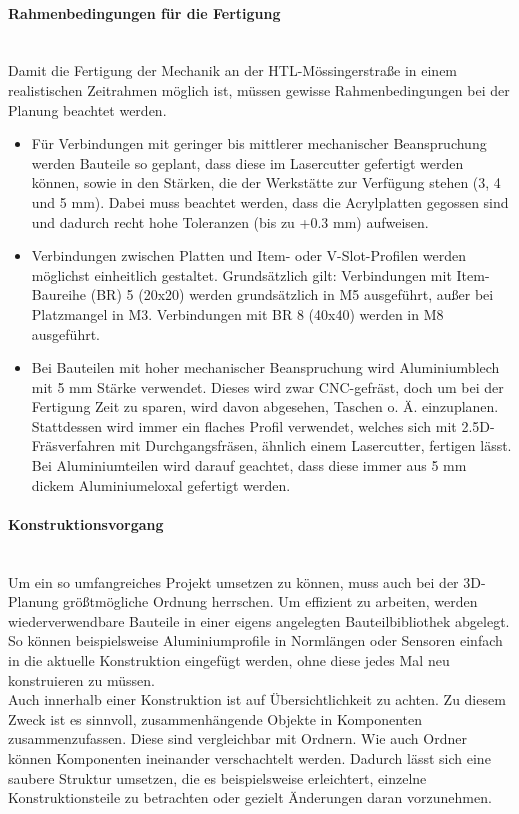 \paragraph{Rahmenbedingungen für die Fertigung}\mbox{}\\
Damit die Fertigung der Mechanik an der HTL-Mössingerstraße in einem realistischen Zeitrahmen möglich ist, müssen gewisse Rahmenbedingungen bei der Planung beachtet werden.
\begin{itemize}
    \item Für Verbindungen mit geringer bis mittlerer mechanischer Beanspruchung werden Bauteile so geplant, dass diese im Lasercutter gefertigt werden können, sowie in den Stärken, die der Werkstätte zur Verfügung stehen (3, 4 und 5 mm). Dabei muss beachtet werden, dass die Acrylplatten gegossen sind und dadurch recht hohe Toleranzen (bis zu +0.3 mm) aufweisen.
    \item Verbindungen zwischen Platten und Item- oder V-Slot-Profilen werden möglichst einheitlich gestaltet. Grundsätzlich gilt: Verbindungen mit Item-Baureihe (BR) 5 (20x20) werden grundsätzlich in M5 ausgeführt, außer bei Platzmangel in M3. Verbindungen mit BR 8 (40x40) werden in M8 ausgeführt.
    \item Bei Bauteilen mit hoher mechanischer Beanspruchung wird Aluminiumblech mit 5 mm Stärke verwendet. Dieses wird zwar CNC-gefräst, doch um bei der Fertigung Zeit zu sparen, wird davon abgesehen, Taschen o. Ä. einzuplanen. Stattdessen wird immer ein flaches Profil verwendet, welches sich mit 2.5D-Fräsverfahren mit Durchgangsfräsen, ähnlich einem Lasercutter, fertigen lässt. Bei Aluminiumteilen wird darauf geachtet, dass diese immer aus 5 mm dickem Aluminiumeloxal gefertigt werden.
\end{itemize}



\paragraph{Konstruktionsvorgang}\mbox{}\\
Um ein so umfangreiches Projekt umsetzen zu können, muss auch bei der 3D-Planung größtmögliche Ordnung herrschen. Um effizient zu arbeiten, werden wiederverwendbare Bauteile in einer eigens angelegten Bauteilbibliothek abgelegt. So können beispielsweise Aluminiumprofile in Normlängen oder Sensoren einfach in die aktuelle Konstruktion eingefügt werden, ohne diese jedes Mal neu konstruieren zu müssen.
\\
Auch innerhalb einer Konstruktion ist auf Übersichtlichkeit zu achten. Zu diesem Zweck ist es sinnvoll, zusammenhängende Objekte in Komponenten zusammenzufassen. Diese sind vergleichbar mit Ordnern. Wie auch Ordner können Komponenten ineinander verschachtelt werden. Dadurch lässt sich eine saubere Struktur umsetzen, die es beispielsweise erleichtert, einzelne Konstruktionsteile zu betrachten oder gezielt Änderungen daran vorzunehmen.


